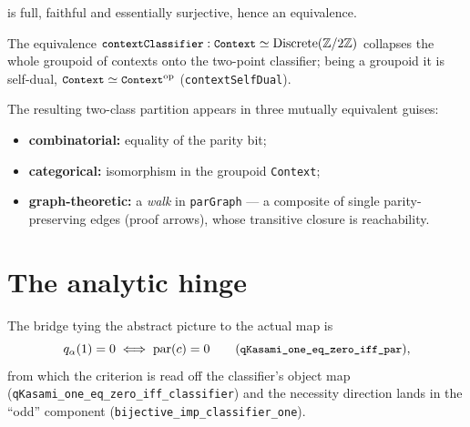 \documentclass[11pt]{article}
\newcommand{\lst}[1]{{\small\texttt{#1}}}
\newcommand{\Zmod}{\mathbb{Z}/2\mathbb{Z}}
\theoremstyle{definition}
\begin{document}
\noindent \lst{parFunctor} is full, faithful and essentially surjective, hence an
equivalence.

\noindent The equivalence $\text{\lst{contextClassifier}} :
\text{\lst{Context}} \simeq \mathrm{Discrete}(\Zmod)$ collapses the whole
groupoid of contexts onto the two-point classifier; being a groupoid it is
self-dual, $\text{\lst{Context}}\simeq\text{\lst{Context}}^{\mathrm{op}}$
(\lst{contextSelfDual}).

The resulting two-class partition appears in three mutually equivalent guises:

\begin{center}
\end{center}

\begin{itemize}[leftmargin=1.4em, itemsep=2pt]
  \item \textbf{combinatorial:} equality of the parity bit;
  \item \textbf{categorical:} isomorphism in the groupoid \lst{Context};
  \item \textbf{graph-theoretic:} a \emph{walk} in \lst{parGraph} --- a composite
        of single parity-preserving edges (proof arrows), whose transitive
        closure is reachability.
\end{itemize}

\section{The analytic hinge}

The bridge tying the abstract picture to the actual map is
\[
  q_\alpha(1)=0 \;\Longleftrightarrow\; \mathrm{par}(c)=0
  \qquad(\text{\lst{qKasami\_one\_eq\_zero\_iff\_par}}),
\]
from which the criterion is read off the classifier's object map
(\lst{qKasami\_one\_eq\_zero\_iff\_classifier}) and the necessity direction lands
in the ``odd'' component (\lst{bijective\_imp\_classifier\_one}).

\begin{center}
\end{center}
\end{document}
